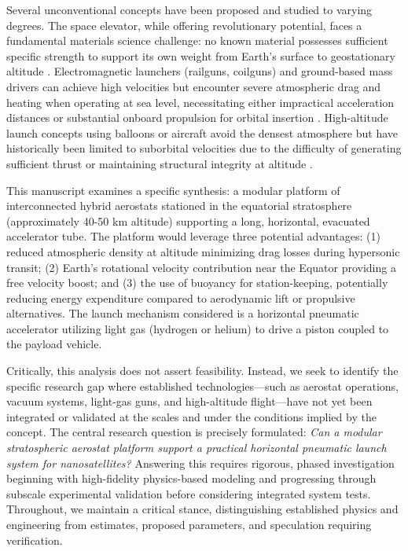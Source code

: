 Several unconventional concepts have been proposed and studied to varying degrees. The space elevator, while offering revolutionary potential, faces a fundamental materials science challenge: no known material possesses sufficient specific strength to support its own weight from Earth's surface to geostationary altitude \cite{edwards2003}. Electromagnetic launchers (railguns, coilguns) and ground-based mass drivers can achieve high velocities but encounter severe atmospheric drag and heating when operating at sea level, necessitating either impractical acceleration distances or substantial onboard propulsion for orbital insertion \cite{miller2013}. High-altitude launch concepts using balloons or aircraft avoid the densest atmosphere but have historically been limited to suborbital velocities due to the difficulty of generating sufficient thrust or maintaining structural integrity at altitude \cite{brown2002}.

This manuscript examines a specific synthesis: a modular platform of interconnected hybrid aerostats stationed in the equatorial stratosphere (approximately 40-50 km altitude) supporting a long, horizontal, evacuated accelerator tube. The platform would leverage three potential advantages: (1) reduced atmospheric density at altitude minimizing drag losses during hypersonic transit; (2) Earth's rotational velocity contribution near the Equator providing a free velocity boost; and (3) the use of buoyancy for station-keeping, potentially reducing energy expenditure compared to aerodynamic lift or propulsive alternatives. The launch mechanism considered is a horizontal pneumatic accelerator utilizing light gas (hydrogen or helium) to drive a piston coupled to the payload vehicle.

Critically, this analysis does not assert feasibility. Instead, we seek to identify the specific research gap where established technologies—such as aerostat operations, vacuum systems, light-gas guns, and high-altitude flight—have not yet been integrated or validated at the scales and under the conditions implied by the concept. The central research question is precisely formulated: \emph{Can a modular stratospheric aerostat platform support a practical horizontal pneumatic launch system for nanosatellites?} Answering this requires rigorous, phased investigation beginning with high-fidelity physics-based modeling and progressing through subscale experimental validation before considering integrated system tests. Throughout, we maintain a critical stance, distinguishing established physics and engineering from estimates, proposed parameters, and speculation requiring verification.

